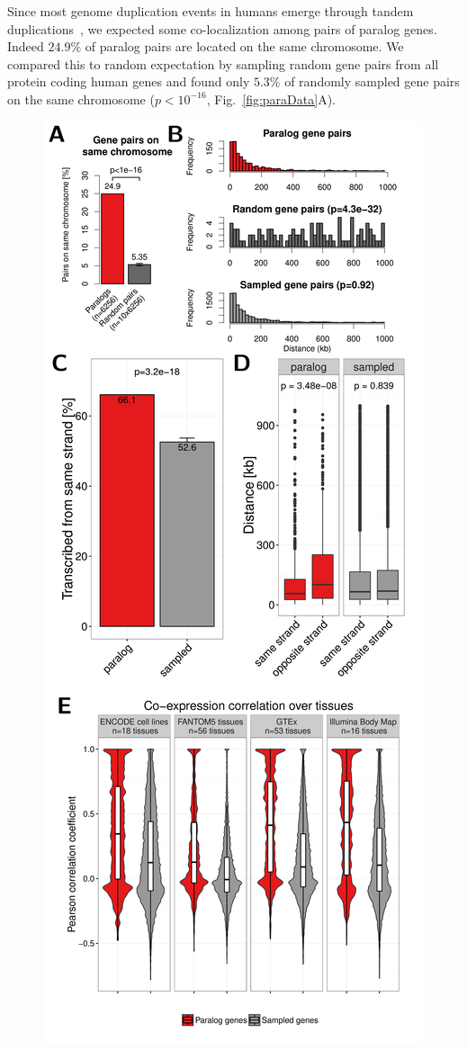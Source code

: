 \documentclass[a4paper,twoside=true,openright,parskip=full,chapterprefix=true,11pt,headings=normal,bibliography=totoc,listof=totoc,titlepage=on,captions=tableabove,draft=false]{scrreprt}
\theoremstyle{definition}
\theoremstyle{definition}
\theoremstyle{definition}
\theoremstyle{remark}
\begin{document}
Since most genome duplication events in humans emerge through tandem
duplications~\citep{Newman2015}, we expected some co-localization among
pairs of paralog genes. Indeed \(24.9\%\) of paralog pairs are located
on the same chromosome. We compared this to random expectation by
sampling random gene pairs from all protein coding human genes and found
only \(5.3\%\) of randomly sampled gene pairs on the same chromosome
(\(p<10^{-16}\), Fig.~\ref{fig:paraData}A).

\begin{figure}

{\centering \includegraphics[width=0.5\linewidth]{figures/paralog/fig1_09} 

}


\end{figure}
\end{document}
